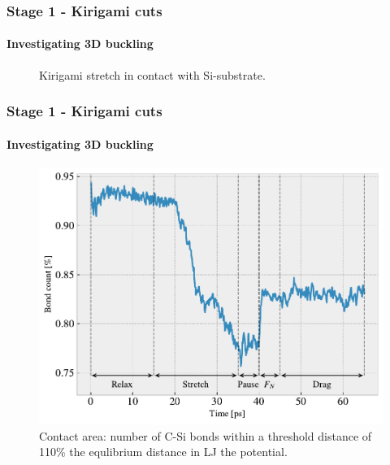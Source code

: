 \documentclass[
	10pt, %
]{beamer}
\begin{document}
\begin{frame}
	\frametitle{Stage 1 - Kirigami cuts}
	\framesubtitle{Investigating 3D buckling}
	
	\begin{figure}
		\centering    
		\caption{Kirigami stretch in contact with Si-substrate.}
	\end{figure} 
	
	
	
\end{frame}


\begin{frame}
	\frametitle{Stage 1 - Kirigami cuts}
	\framesubtitle{Investigating 3D buckling}


	\begin{figure}
		\includegraphics[width=0.7\linewidth]{figures/contact_pct.pdf}
		\caption{Contact area: number of C-Si bonds within a threshold distance of 110\% the equlibrium distance in LJ the potential.}
	\end{figure}	

	
\end{frame}
\end{document}
